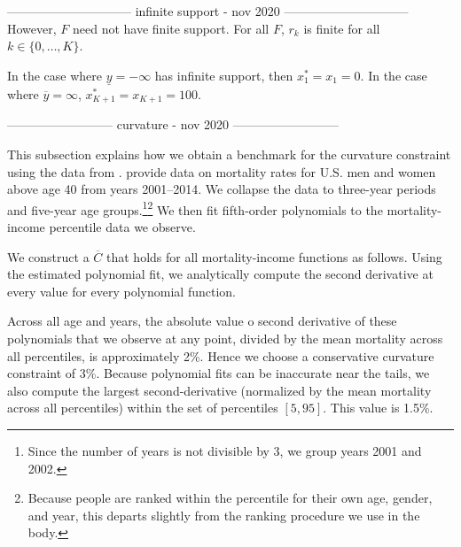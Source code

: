 ------------------------------
infinite support - nov 2020 
------------------------------
However, $F$ need not have finite
support. For all $F$, $r_k$ is finite for all $k \in
\{0,\dots,K\}$. 

In the case where $\underline{y} = -\infty$ has infinite support, then
  $x_1^* = x_1 = 0$. In the case where $\overline{y} = \infty$, $x_{K+1}^*
  = x_{K+1} = 100$.

--------------------------
curvature - nov 2020 
--------------------------

This subsection explains how we obtain a benchmark for the curvature constraint
using the data from \citet{Chetty2016b}. \citet{Chetty2016b} provide
data on mortality rates for U.S. men and women above age 40 from years
2001--2014. We collapse the data to three-year periods and five-year
age groups.\footnote{Since the number of years is not divisible by 3,
  we group years 2001 and 2002.}\footnote{Because people are ranked
  within the percentile for their own age, gender, and year, this
  departs slightly from the ranking procedure we use in the body.} We then fit fifth-order
polynomials to the mortality-income percentile data we observe. 

We construct a $\overline{C}$ that holds for all mortality-income
functions as follows. Using the estimated polynomial fit, we
analytically compute the second derivative at every value for every
polynomial function. 

Across
all age and years, the absolute value o second derivative of these polynomials
that we observe at any point, divided by the mean mortality across all
percentiles, is approximately 2\%. Hence we choose a conservative
curvature constraint of 3\%. Because polynomial fits can be inaccurate
near the tails, we also compute the largest second-derivative
(normalized by the mean mortality across all percentiles) within the
set of percentiles $[5,95]$. This value is 1.5\%. 


